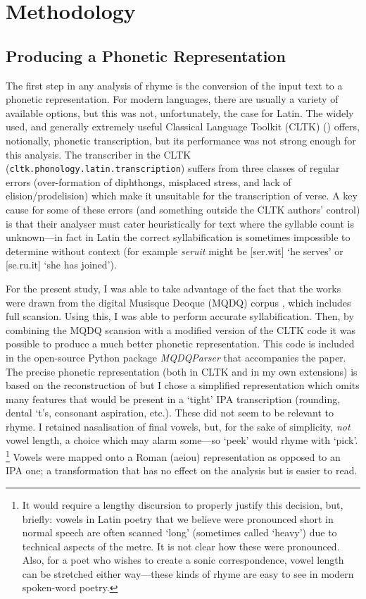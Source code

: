 \documentclass[twocolumn, switch]{article} %
\begin{document}
\section{Methodology}
\label{sec:methods}

\subsection{Producing a Phonetic Representation}

The first step in any analysis of rhyme is the conversion of the input text to
a phonetic representation. For modern languages, there are usually a variety
of available options, but this was not, unfortunately, the case for Latin. The
widely used, and generally extremely useful Classical Language Toolkit (CLTK)
() offers, notionally, phonetic transcription, but its
performance was not strong enough for this analysis. The transcriber in the
CLTK (\texttt{cltk.phonology.latin.transcription}) suffers from three classes
of regular errors (over-formation of diphthongs, misplaced stress, and lack of
elision/prodelision) which make it unsuitable for the transcription of verse.
A key cause for some of these errors (and something outside the CLTK authors'
control) is that their analyser must cater heuristically for text where the
syllable count is unknown---in fact in Latin the correct syllabification is
sometimes impossible to determine without context (for example \emph{seruit}
might be [ser.wit] `he serves' or [se.ru.it] `she has joined').

For the present study, I was able to take advantage of the fact that the works
were drawn from the digital Musisque Deoque (MQDQ) corpus \cite{mqdq_2007},
which includes full scansion. Using this, I was able to perform accurate
syllabification. Then, by combining the MQDQ scansion with a modified version
of the CLTK code it was possible to produce a much better phonetic
representation. This code is included in the open-source Python package
\emph{MQDQParser} \cite{nagy_mqdq_2019} that accompanies the paper. The
precise phonetic representation (both in CLTK and in my own extensions) is
based on the reconstruction of  but I chose a simplified
representation which omits many features that would be present in a `tight'
IPA transcription (rounding, dental `t's, consonant aspiration, etc.). These
did not seem to be relevant to rhyme. I retained nasalisation of final vowels,
but, for the sake of simplicity, \emph{not} vowel length, a choice which may
alarm some---so `peek' would rhyme with `pick'. \footnote{
  It would require a lengthy discursion to properly justify this decision, but,
  briefly: vowels in Latin poetry that we believe were pronounced short in
  normal speech are often scanned `long' (sometimes called `heavy') due to
  technical aspects of the metre. It is not clear how these were pronounced.
  Also, for a poet who wishes to create a sonic correspondence, vowel length can
  be stretched either way---these kinds of rhyme are easy to see in modern
  spoken-word poetry.
}
Vowels were mapped onto a Roman (aeiou) representation as opposed to an IPA
one; a transformation that has no effect on the analysis but is easier to
read.
\end{document}
